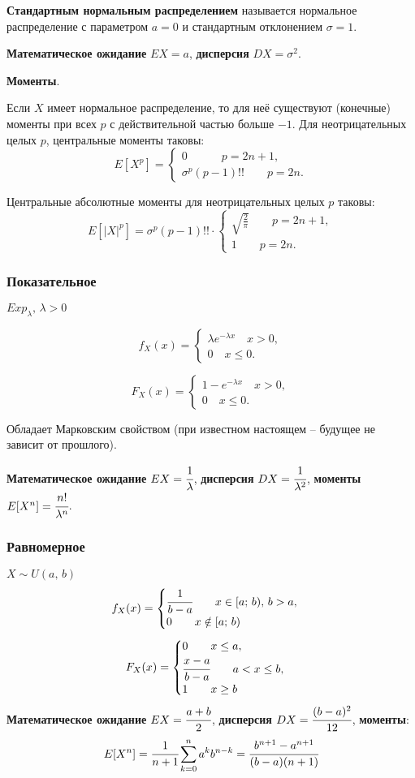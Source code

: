 \documentclass{article}
\begin{document}
\textbf{Стандартным нормальным распределением} называется нормальное распределение с параметром $a=0$ и стандартным отклонением $\sigma=1$.

\textbf{Математическое ожидание} $EX=a$, \textbf{дисперсия} $DX=\sigma^2$.

\textbf{Моменты}.

Если $X$ имеет нормальное распределение, то для неё существуют (конечные) моменты при всех $p$ с действительной частью больше $-1$. Для неотрицательных целых $p$, центральные моменты таковы:
$$ E[X^p]=\begin{cases}0\quad\quad\quad p=2n+1,\\ \sigma^p(p-1)!!\quad\quad p=2n.\end{cases} $$

Центральные абсолютные моменты для неотрицательных целых $p$ таковы:
$$ E[|X|^p]=\sigma^p(p-1)!!\cdot\begin{cases}\sqrt{\frac{2}{\pi}} \quad\quad p=2n+1,\\1\quad\quad p=2n.\end{cases} $$
\subsubsection{Показательное}
$Exp_{\lambda},\,\lambda>0$

$$f_X(x)=\begin{cases}\lambda e^{-\lambda x}\quad x>0,\\0\quad x\leq 0.\end{cases}$$

$$F_X(x)=\begin{cases}1- e^{-\lambda x}\quad x>0,\\0\quad x\leq 0.\end{cases}$$

Обладает Марковским свойством (при известном настоящем -- будущее не зависит от прошлого).

\textbf{Математическое ожидание} $EX=\cfrac{1}{\lambda}$, \textbf{дисперсия} $DX=\cfrac{1}{\lambda^2}$, \textbf{моменты} $E[X^n]=\cfrac{n!}{\lambda^n}$.

\subsubsection{Равномерное}
$X\sim U(a,\,b)$
$$ f_X(x)=\begin{cases}
\cfrac{1}{b-a}\quad\quad x\in [a;\,b),\,b>a,\\
0\quad\quad x\notin[a;\,b)
\end{cases}$$
$$ F_X(x)=\begin{cases}
0 \quad\quad x\leq a,\\
\cfrac{x-a}{b-a}\quad\quad a<x\leq b,\\
1\quad\quad x\geq b
\end{cases} $$
\textbf{Математическое ожидание} $EX=\cfrac{a+b}{2}$, \textbf{дисперсия} $DX=\cfrac{(b-a)^2}{12}$, \textbf{моменты}:
$$ E[X^n]=\cfrac{1}{n+1}\sum_{k=0}^n a^k b^{n-k}=\cfrac{b^{n+1}-a^{n+1}}{(b-a)(n+1)} $$
\newpage
\end{document}
